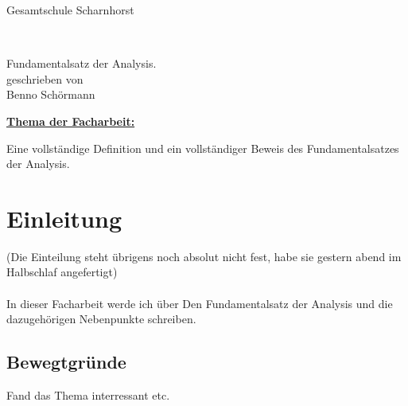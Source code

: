 \documentclass[fontsize=12pt,paper=a4,DIV12,cleardoublepage=empty, 
liststotoc,idxtotoc,bibtotoc]{article}
\theoremstyle{plain}
\theoremstyle{definition}
\begin{document}
	\begin{titlepage}
		\vspace*{-3cm}
		\noindent
		\hspace*{1cm}
		\begin{minipage}{0.05\textwidth}
			\begin{figure}[H]
				\centering 
			\end{figure}
		\end{minipage}
		\begin{minipage}{.95\textwidth}
			\begin{center}
				\centering
				{\LARGE Gesamtschule Scharnhorst}
			\end{center}
		\end{minipage}
		\\[0.5cm]
		\begin{center}
		\Large{Fundamentalsatz der Analysis}.\\[0.5cm]
		\normalsize{geschrieben von}\\[0.25cm]	
		\large{Benno Schörmann}\\[0.5cm]
		\end{center}
	\begin{flushleft}
	\hyperref[subsec:thema1]{\textbf{\large Thema der Facharbeit:}}  \\
	\end{flushleft}
	Eine vollständige Definition und ein vollständiger Beweis des Fundamentalsatzes der Analysis. 
	\quad \\[1.5cm]
	\noindent 
	\renewcommand{\arraystretch}{1.4}
	\end{titlepage}
	\newpage
	\thispagestyle{empty}
	\tableofcontents
	\newpage
	\section{Einleitung}
	(Die Einteilung steht übrigens noch absolut nicht fest, habe sie gestern abend im Halbschlaf angefertigt) \\\\
	In dieser Facharbeit werde ich über Den Fundamentalsatz der Analysis und die dazugehörigen Nebenpunkte schreiben.
	
	
	\subsection{Bewegtgründe}
	Fand das Thema interressant etc.
	
\end{document}
